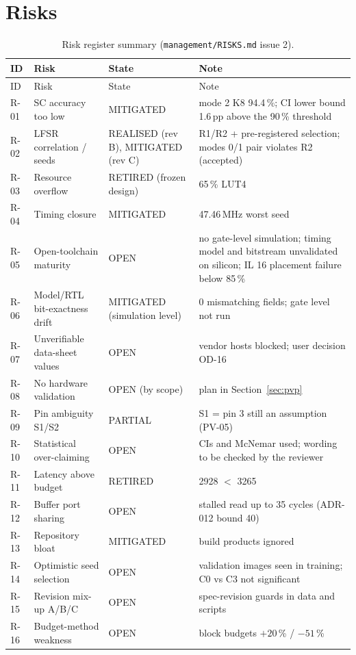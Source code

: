 \documentclass[10pt,a4paper]{article}
\begin{document}
\section{Risks}
\label{sec:risks}
{\small
\begin{longtable}{@{}P{0.9cm}P{4.6cm}P{2.8cm}P{6.3cm}@{}}
\caption{Risk register summary (\texttt{management/RISKS.md} issue 2).}\label{tab:risks}\\
\toprule
ID & Risk & State & Note\\
\midrule
\endfirsthead
\toprule
ID & Risk & State & Note\\
\midrule
\endhead
R-01 & SC accuracy too low & MITIGATED & mode 2 K8 94.4\,\%; CI lower bound 1.6\,pp above the 90\,\% threshold \\
R-02 & LFSR correlation / seeds & REALISED (rev B), MITIGATED (rev C) & R1/R2 + pre-registered selection; modes 0/1 pair violates R2 (accepted) \\
R-03 & Resource overflow & RETIRED (frozen design) & 65\,\% LUT4 \\
R-04 & Timing closure & MITIGATED & 47.46\,MHz worst seed \\
R-05 & Open-toolchain maturity & OPEN & no gate-level simulation; timing model and bitstream unvalidated on silicon; IL 16 placement failure below 85\,\% \\
R-06 & Model/RTL bit-exactness drift & MITIGATED (simulation level) & 0 mismatching fields; gate level not run \\
R-07 & Unverifiable data-sheet values & OPEN & vendor hosts blocked; user decision OD-16 \\
R-08 & No hardware validation & OPEN (by scope) & plan in Section~\ref{sec:pvp} \\
R-09 & Pin ambiguity S1/S2 & PARTIAL & S1 = pin 3 still an assumption (PV-05) \\
R-10 & Statistical over-claiming & OPEN & CIs and McNemar used; wording to be checked by the reviewer \\
R-11 & Latency above budget & RETIRED & 2928 $<$ 3265 \\
R-12 & Buffer port sharing & OPEN & stalled read up to 35 cycles (ADR-012 bound 40) \\
R-13 & Repository bloat & MITIGATED & build products ignored \\
R-14 & Optimistic seed selection & OPEN & validation images seen in training; C0 vs C3 not significant \\
R-15 & Revision mix-up A/B/C & OPEN & spec-revision guards in data and scripts \\
R-16 & Budget-method weakness & OPEN & block budgets $+20$\,\% / $-51$\,\% \\
\bottomrule
\end{longtable}
}
\end{document}
